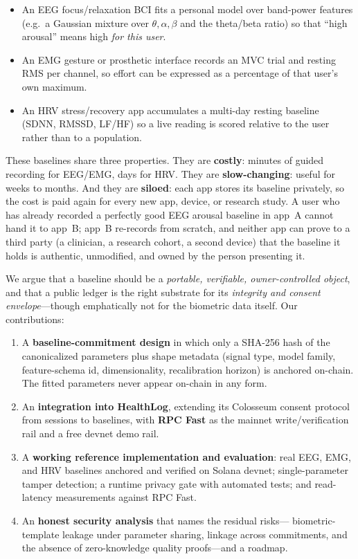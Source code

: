 \documentclass[10pt,twocolumn]{article}
\begin{document}
\begin{itemize}
\item An EEG focus/relaxation BCI fits a personal model over band-power
  features (e.g.\ a Gaussian mixture over $\theta,\alpha,\beta$ and the
  theta/beta ratio) so that ``high arousal'' means high \emph{for this user}.
\item An EMG gesture or prosthetic interface records an MVC trial and resting
  RMS per channel, so effort can be expressed as a percentage of that user's
  own maximum.
\item An HRV stress/recovery app accumulates a multi-day resting baseline
  (SDNN, RMSSD, LF/HF) so a live reading is scored relative to the user rather
  than to a population.
\end{itemize}

These baselines share three properties. They are \textbf{costly}: minutes of
guided recording for EEG/EMG, days for HRV. They are \textbf{slow-changing}:
useful for weeks to months. And they are \textbf{siloed}: each app stores its
baseline privately, so the cost is paid again for every new app, device, or
research study. A user who has already recorded a perfectly good EEG arousal
baseline in app~A cannot hand it to app~B; app~B re-records from scratch, and
neither app can prove to a third party (a clinician, a research cohort, a second
device) that the baseline it holds is authentic, unmodified, and owned by the
person presenting it.

We argue that a baseline should be a \emph{portable, verifiable, owner-controlled
object}, and that a public ledger is the right substrate for its
\emph{integrity and consent envelope}---though emphatically not for the biometric
data itself. Our contributions:

\begin{enumerate}
\item A \textbf{baseline-commitment design} in which only a SHA-256 hash of the
  canonicalized parameters plus shape metadata (signal type, model family,
  feature-schema id, dimensionality, recalibration horizon) is anchored
  on-chain. The fitted parameters never appear on-chain in any form.
\item An \textbf{integration into HealthLog}, extending its Colosseum consent
  protocol from sessions to baselines, with \textbf{RPC Fast} as the mainnet
  write/verification rail and a free devnet demo rail.
\item A \textbf{working reference implementation and evaluation}: real EEG, EMG,
  and HRV baselines anchored and verified on Solana devnet; single-parameter
  tamper detection; a runtime privacy gate with automated tests; and read-latency
  measurements against RPC Fast.
\item An \textbf{honest security analysis} that names the residual risks---
  biometric-template leakage under parameter sharing, linkage across
  commitments, and the absence of zero-knowledge quality proofs---and a roadmap.
\end{enumerate}
\end{document}
